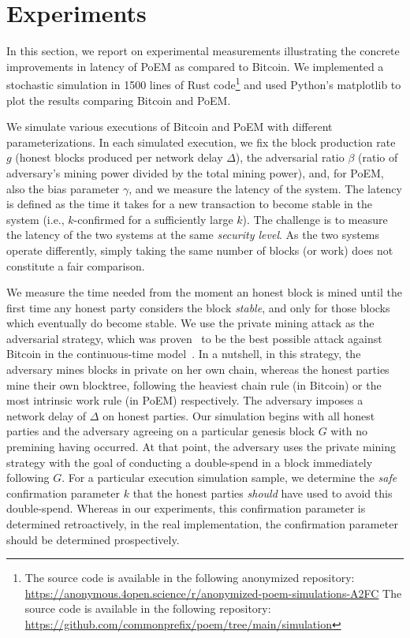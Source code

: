 \section{Experiments}\label{sec:experiments}

In this section, we report on experimental measurements illustrating the concrete improvements
in latency of PoEM as compared to Bitcoin. We implemented a stochastic simulation in 1500 lines of
Rust code\footnote{
    \ifanonymous
    The source code is available in the following anonymized repository:
    \url{https://anonymous.4open.science/r/anonymized-poem-simulations-A2FC}
\else
    The source code is available in the following repository:
    \url{https://github.com/commonprefix/poem/tree/main/simulation}
\fi
} and used Python's matplotlib
to plot the results comparing Bitcoin and PoEM.

We simulate various executions of Bitcoin and PoEM with different parameterizations.
In each simulated execution, we fix the block production rate $g$ (honest blocks produced per network delay $\Delta$),
the adversarial ratio $\beta$ (ratio of adversary's mining power divided by the total mining power),
and, for PoEM, also the bias parameter $\gamma$, and we
measure the latency of the system. The latency is defined as the time it takes for a new transaction
to become stable in the system (i.e., $k$-confirmed for a sufficiently large $k$).
The challenge is to measure the latency of the two
systems at the same \emph{security level}. As the two systems operate differently, simply
taking the same number of blocks (or work) does not constitute a fair comparison.

We measure the time needed from the moment an honest block is mined until
the first time any honest party considers the block \emph{stable}, and only for those blocks
which eventually do become stable.
We use the private mining attack as the adversarial strategy, which was
proven~\cite{eiar} to be the best possible attack against Bitcoin in the continuous-time model~\cite{bitcoin-made-simple}.
In a nutshell, in this strategy, the adversary mines blocks in private on her own chain, whereas the honest parties mine
their own blocktree, following the heaviest chain rule (in Bitcoin) or the most intrinsic work rule (in PoEM) respectively.
The adversary imposes a network delay of $\Delta$ on honest parties.
Our simulation begins with all honest parties and the adversary agreeing on a particular genesis block
$G$ with no premining having occurred. At that point, the adversary uses the private mining strategy
with the goal of conducting a double-spend in a block immediately following $G$.
For a particular execution simulation sample, we determine the \emph{safe} confirmation parameter $k$
that the honest parties \emph{should} have used to avoid this double-spend.
Whereas in our experiments, this confirmation parameter is determined retroactively,
in the real implementation, the confirmation parameter should be determined prospectively.


